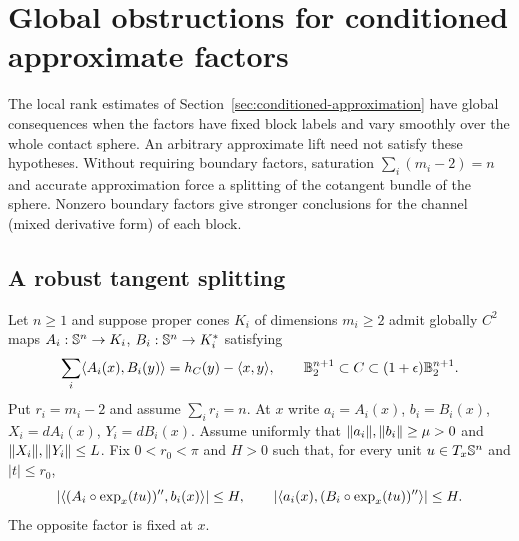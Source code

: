 \section{Global obstructions for conditioned approximate factors}
\label{app:approximation-refinements}
The local rank estimates of Section~\ref{sec:conditioned-approximation}
have global consequences when the factors have fixed block labels and
vary smoothly over the whole contact sphere. An arbitrary approximate
lift need not satisfy these hypotheses. Without requiring boundary
factors, saturation $\sum_i(m_i-2)=n$ and accurate approximation force a
splitting of the cotangent bundle of the sphere. Nonzero boundary factors
give stronger conclusions for the channel (mixed derivative form) of
each block.

\subsection{A robust tangent splitting}
Let $n\geq1$ and suppose proper cones $K_i$ of dimensions $m_i\geq2$
admit globally $C^2$ maps $A_i:\mathbb S^n\to K_i$,
$B_i:\mathbb S^n\to K_i^*$ satisfying
\begin{equation}\label{eq:global-approximate-slack}
 \sum_i\langle A_i(x),B_i(y)\rangle=h_C(y)-\langle x,y\rangle,\qquad
 \mathbb B_2^{n+1}\subset C\subset(1+\epsilon)\mathbb B_2^{n+1}.
\end{equation}
Put $r_i=m_i-2$ and assume $\sum_i r_i=n$. At $x$ write
$a_i=A_i(x)$, $b_i=B_i(x)$, $X_i=dA_i(x)$, $Y_i=dB_i(x)$.
Assume uniformly that
$\lVert a_i\rVert,\lVert b_i\rVert\geq\mu>0$ and
$\lVert X_i\rVert,\lVert Y_i\rVert\leq L$. Fix $0<r_0<\pi$ and $H>0$ such that,
for every unit $u\in T_x\mathbb S^n$ and $|t|\leq r_0$,
\[
 |\langle (A_i\circ\exp_x(tu))'',b_i(x)\rangle|\leq H,\qquad
 |\langle a_i(x),(B_i\circ\exp_x(tu))''\rangle|\leq H.
\]
The opposite factor is fixed at $x$.

